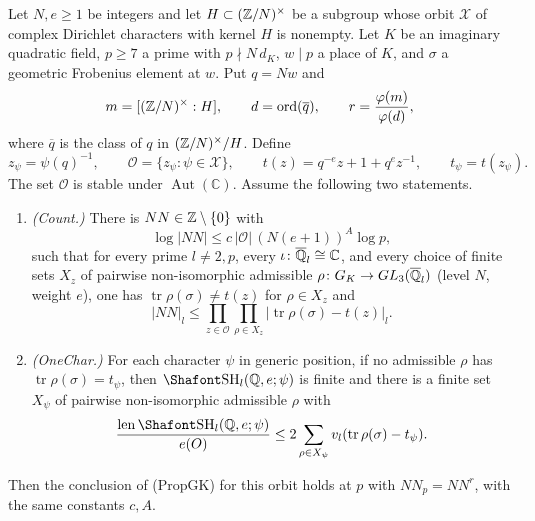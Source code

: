 \begin{proposition}
\label{w4:prop:onechar2prop}
Let $N,e\ge1$ be integers and let
$H\subset(\mathbb Z/N)^\times$ be a subgroup whose orbit
$\mathcal X$ of complex Dirichlet characters with kernel $H$
is nonempty.
Let $K$ be an imaginary quadratic field, $p\ge7$ a prime
with $p\nmid N\,d_K$, $w\mid p$ a place of $K$, and
$\sigma$ a geometric Frobenius element at $w$.
Put $q=Nw$ and
\[
m=[(\mathbb Z/N)^\times:H],\qquad
d=\operatorname{ord}(\overline q),\qquad
r=\frac{\varphi(m)}{\varphi(d)},
\]
where $\overline q$ is the class of $q$ in $(\mathbb Z/N)^\times/H$.
Define
\[
z_\psi=\psi(q)^{-1},\qquad
\mathcal O=\{z_\psi:\psi\in\mathcal X\},\qquad
t(z)=q^{-e}z+1+q^ez^{-1},\qquad
t_\psi=t(z_\psi).
\]
The set $\mathcal O$ is stable under
$\operatorname{Aut}(\mathbb C)$.
Assume the following two statements.
\begin{enumerate}[leftmargin=*,label=(\alph*)]
\item \emph{(Count.)}
There is $NN\in\mathbb Z\setminus\{0\}$ with
\[
\log|NN|\le c\,|\mathcal O|\,(N(e+1))^A\log p,
\]
such that for every prime $l\ne2,p$, every
$\iota\colon\overline{\mathbb Q}_l\cong\mathbb C$, and every
choice of finite sets $X_z$ of pairwise non-isomorphic
admissible $\rho\colon G_K\to GL_3(\overline{\mathbb Q}_l)$
(level $N$, weight $e$), one has
$\operatorname{tr}\rho(\sigma)\ne t(z)$ for $\rho\in X_z$
and
\[
|NN|_l\le
\prod_{z\in\mathcal O}\prod_{\rho\in X_z}
|\operatorname{tr}\rho(\sigma)-t(z)|_l.
\]
\item \emph{(OneChar.)}
For each character $\psi$ in generic position, if no
admissible $\rho$ has
$\operatorname{tr}\rho(\sigma)=t_\psi$, then
$\Sha_l(\Q,e;\psi)$ is finite and there is a finite set
$X_\psi$ of pairwise non-isomorphic admissible $\rho$ with
\[
\frac{\len\Sha_l(\Q,e;\psi)}{e(O)}
\le
2\sum_{\rho\in X_\psi}
v_l(\operatorname{tr}\rho(\sigma)-t_\psi).
\]
\end{enumerate}
Then the conclusion of (PropGK) for this orbit holds at $p$
with $NN_p=NN^r$, with the same constants $c,A$.
\end{proposition}

